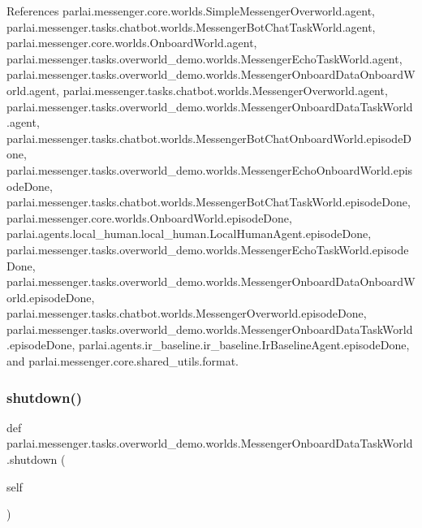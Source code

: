 References parlai.\+messenger.\+core.\+worlds.\+Simple\+Messenger\+Overworld.\+agent, parlai.\+messenger.\+tasks.\+chatbot.\+worlds.\+Messenger\+Bot\+Chat\+Task\+World.\+agent, parlai.\+messenger.\+core.\+worlds.\+Onboard\+World.\+agent, parlai.\+messenger.\+tasks.\+overworld\+\_\+demo.\+worlds.\+Messenger\+Echo\+Task\+World.\+agent, parlai.\+messenger.\+tasks.\+overworld\+\_\+demo.\+worlds.\+Messenger\+Onboard\+Data\+Onboard\+World.\+agent, parlai.\+messenger.\+tasks.\+chatbot.\+worlds.\+Messenger\+Overworld.\+agent, parlai.\+messenger.\+tasks.\+overworld\+\_\+demo.\+worlds.\+Messenger\+Onboard\+Data\+Task\+World.\+agent, parlai.\+messenger.\+tasks.\+chatbot.\+worlds.\+Messenger\+Bot\+Chat\+Onboard\+World.\+episode\+Done, parlai.\+messenger.\+tasks.\+overworld\+\_\+demo.\+worlds.\+Messenger\+Echo\+Onboard\+World.\+episode\+Done, parlai.\+messenger.\+tasks.\+chatbot.\+worlds.\+Messenger\+Bot\+Chat\+Task\+World.\+episode\+Done, parlai.\+messenger.\+core.\+worlds.\+Onboard\+World.\+episode\+Done, parlai.\+agents.\+local\+\_\+human.\+local\+\_\+human.\+Local\+Human\+Agent.\+episode\+Done, parlai.\+messenger.\+tasks.\+overworld\+\_\+demo.\+worlds.\+Messenger\+Echo\+Task\+World.\+episode\+Done, parlai.\+messenger.\+tasks.\+overworld\+\_\+demo.\+worlds.\+Messenger\+Onboard\+Data\+Onboard\+World.\+episode\+Done, parlai.\+messenger.\+tasks.\+chatbot.\+worlds.\+Messenger\+Overworld.\+episode\+Done, parlai.\+messenger.\+tasks.\+overworld\+\_\+demo.\+worlds.\+Messenger\+Onboard\+Data\+Task\+World.\+episode\+Done, parlai.\+agents.\+ir\+\_\+baseline.\+ir\+\_\+baseline.\+Ir\+Baseline\+Agent.\+episode\+Done, and parlai.\+messenger.\+core.\+shared\+\_\+utils.\+format.

\mbox{\label{classparlai_1_1messenger_1_1tasks_1_1overworld__demo_1_1worlds_1_1MessengerOnboardDataTaskWorld_a6a425d57f7ee88211231d05f6412f9be}} 
\subsubsection{\texorpdfstring{shutdown()}{shutdown()}}
{\footnotesize\ttfamily def parlai.\+messenger.\+tasks.\+overworld\+\_\+demo.\+worlds.\+Messenger\+Onboard\+Data\+Task\+World.\+shutdown (\begin{DoxyParamCaption}\item[{}]{self }\end{DoxyParamCaption})}



